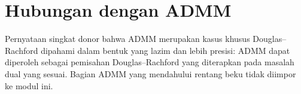 \section{Hubungan dengan ADMM}
\label{becker:section:dr-admm}

Pernyataan singkat donor bahwa ADMM merupakan kasus khusus
Douglas--Rachford dipahami dalam bentuk yang lazim dan lebih presisi: ADMM
dapat diperoleh sebagai pemisahan Douglas--Rachford yang diterapkan pada
masalah dual yang sesuai. Bagian ADMM yang mendahului rentang beku tidak
diimpor ke modul ini.
